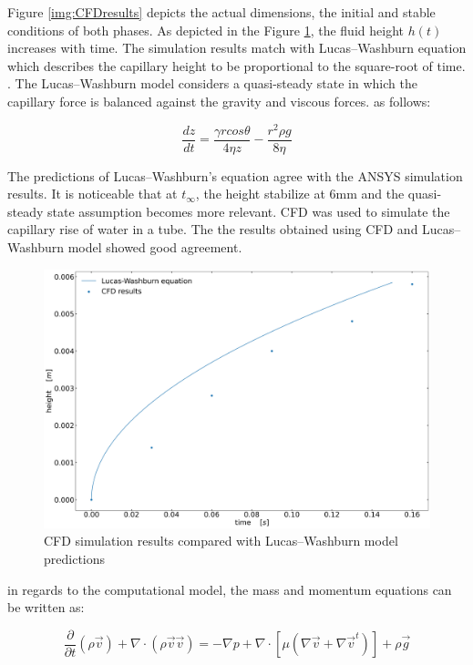 \documentclass{article}
\begin{document}
Figure \ref{img:CFDresults} depicts the actual dimensions, the initial and stable conditions of both phases. As depicted in the Figure \ref{img:modelVScfd}, the fluid height $h(t)$ increases with time. The simulation results match with Lucas–Washburn equation which describes the capillary height to be proportional to the square-root of time. \cite{Fisher1980, Oliva1975}. The Lucas–Washburn model considers a quasi-steady state in which the capillary force is balanced against the gravity and viscous forces. \cite{Zhmud2000} as follows:

\begin{dmath}
\frac{d z}{d t} = \frac{\gamma r cos \theta}{4 \eta z} - \frac{r^2 \rho g}{8 \eta}
\end{dmath}

The predictions of Lucas–Washburn's equation agree with the ANSYS simulation results. It is noticeable that at $t_{\infty}$, the height stabilize at $6 \textrm{mm}$ and the quasi-steady state assumption becomes more relevant. CFD was used to simulate the capillary rise of water in a tube. The the results obtained using CFD and Lucas–Washburn model showed good agreement.

 \begin{figure}[h!]
	\centering
	\includegraphics[width=1.00\textwidth]{./modelVScfd.png}
	\caption{CFD simulation results compared with Lucas–Washburn model predictions}
	\label{img:modelVScfd}
\end{figure}

in regards to the computational model, the mass and momentum equations can be written as: 

\begin{dmath}
\frac{\partial}{\partial t} (\rho \vec{v}) + \nabla \cdot (\rho \vec{v} \vec{v}) = - \nabla p + \nabla \cdot [\mu (\nabla \vec{v} + \nabla {\vec{v}}^t)] + \rho \vec{g}
\end{dmath}
\end{document}
